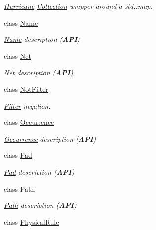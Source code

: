 \begin{DoxyCompactItemize}
\begin{DoxyCompactList}\small\item\em \mbox{\hyperlink{namespaceHurricane}{Hurricane}} \mbox{\hyperlink{classHurricane_1_1Collection}{Collection}} wrapper around a std\+::map. \end{DoxyCompactList}\item 
class \mbox{\hyperlink{classHurricane_1_1Name}{Name}}
\begin{DoxyCompactList}\small\item\em \mbox{\hyperlink{classHurricane_1_1Name}{Name}} description ({\bfseries A\+PI}) \end{DoxyCompactList}\item 
class \mbox{\hyperlink{classHurricane_1_1Net}{Net}}
\begin{DoxyCompactList}\small\item\em \mbox{\hyperlink{classHurricane_1_1Net}{Net}} description ({\bfseries A\+PI}) \end{DoxyCompactList}\item 
class \mbox{\hyperlink{classHurricane_1_1NotFilter}{Not\+Filter}}
\begin{DoxyCompactList}\small\item\em \mbox{\hyperlink{classHurricane_1_1Filter}{Filter}} negation. \end{DoxyCompactList}\item 
class \mbox{\hyperlink{classHurricane_1_1Occurrence}{Occurrence}}
\begin{DoxyCompactList}\small\item\em \mbox{\hyperlink{classHurricane_1_1Occurrence}{Occurrence}} description ({\bfseries A\+PI}) \end{DoxyCompactList}\item 
class \mbox{\hyperlink{classHurricane_1_1Pad}{Pad}}
\begin{DoxyCompactList}\small\item\em \mbox{\hyperlink{classHurricane_1_1Pad}{Pad}} description ({\bfseries A\+PI}) \end{DoxyCompactList}\item 
class \mbox{\hyperlink{classHurricane_1_1Path}{Path}}
\begin{DoxyCompactList}\small\item\em \mbox{\hyperlink{classHurricane_1_1Path}{Path}} description ({\bfseries A\+PI}) \end{DoxyCompactList}\item 
class \mbox{\hyperlink{classHurricane_1_1PhysicalRule}{Physical\+Rule}}

\end{DoxyCompactItemize}
